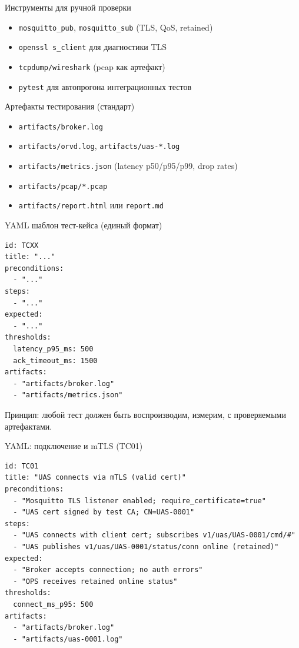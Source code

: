 \documentclass[aspectratio=169]{beamer}
\begin{document}
\begin{frame}[fragile]{Инструменты для ручной проверки}
\begin{itemize}
  \item \texttt{mosquitto\_pub}, \texttt{mosquitto\_sub} (TLS, QoS, retained)
  \item \texttt{openssl s\_client} для диагностики TLS
  \item \texttt{tcpdump/wireshark} (pcap как артефакт)
  \item \texttt{pytest} для автопрогона интеграционных тестов
\end{itemize}
\end{frame}

\begin{frame}[fragile]{Артефакты тестирования (стандарт)}
\begin{itemize}
  \item \texttt{artifacts/broker.log}
  \item \texttt{artifacts/orvd.log}, \texttt{artifacts/uas-*.log}
  \item \texttt{artifacts/metrics.json} (latency p50/p95/p99, drop rates)
  \item \texttt{artifacts/pcap/*.pcap}
  \item \texttt{artifacts/report.html} или \texttt{report.md}
\end{itemize}
\end{frame}

\begin{frame}[fragile]{YAML шаблон тест-кейса (единый формат)}
\begin{Verbatim}[fontsize=\scriptsize, baselinestretch=0.85]  
id: TCXX
title: "..."
preconditions:
  - "..."
steps:
  - "..."
expected:
  - "..."
thresholds:
  latency_p95_ms: 500
  ack_timeout_ms: 1500
artifacts:
  - "artifacts/broker.log"
  - "artifacts/metrics.json"
\end{Verbatim}
Принцип: любой тест должен быть воспроизводим, измерим, с проверяемыми артефактами.
\end{frame}

\begin{frame}[fragile]{YAML: подключение и mTLS (TC01)}
\begin{Verbatim}[fontsize=\scriptsize, baselinestretch=0.85]  
id: TC01
title: "UAS connects via mTLS (valid cert)"
preconditions:
  - "Mosquitto TLS listener enabled; require_certificate=true"
  - "UAS cert signed by test CA; CN=UAS-0001"
steps:
  - "UAS connects with client cert; subscribes v1/uas/UAS-0001/cmd/#"
  - "UAS publishes v1/uas/UAS-0001/status/conn online (retained)"
expected:
  - "Broker accepts connection; no auth errors"
  - "OPS receives retained online status"
thresholds:
  connect_ms_p95: 500
artifacts:
  - "artifacts/broker.log"
  - "artifacts/uas-0001.log"
\end{Verbatim}
\end{frame}
\end{document}
